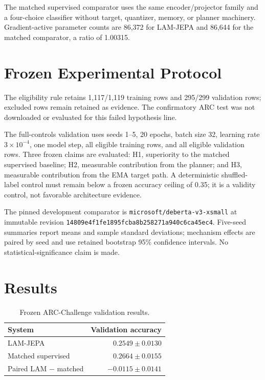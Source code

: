 \documentclass[conference]{IEEEtran}
\begin{document}
The matched supervised comparator uses the same encoder/projector family and a four-choice classifier without target, quantizer, memory, or planner machinery. Gradient-active parameter counts are 86,372 for LAM-JEPA and 86,644 for the matched comparator, a ratio of 1.00315.

\section{Frozen Experimental Protocol}
The eligibility rule retains 1,117/1,119 training rows and 295/299 validation rows; excluded rows remain retained as evidence. The confirmatory ARC test was not downloaded or evaluated for this failed hypothesis line.

The full-controls validation uses seeds 1--5, 20 epochs, batch size 32, learning rate $3\times10^{-4}$, one model step, all eligible training rows, and all eligible validation rows. Three frozen claims are evaluated: H1, superiority to the matched supervised baseline; H2, measurable contribution from the planner; and H3, measurable contribution from the EMA target path. A deterministic shuffled-label control must remain below a frozen accuracy ceiling of 0.35; it is a validity control, not favorable architecture evidence.

The pinned development comparator is \texttt{microsoft/deberta-v3-xsmall} at immutable revision \texttt{14809e4f1fe1895fcba8b258271a940c6ca45ec4}. Five-seed summaries report means and sample standard deviations; mechanism effects are paired by seed and use retained bootstrap 95\% confidence intervals. No statistical-significance claim is made.

\section{Results}
\begin{table}[t]
\caption{Frozen ARC-Challenge validation results.}
\label{tab:main}
\centering
\small
\begin{tabular}{@{}lr@{}}
\toprule
System & Validation accuracy \\
\midrule
LAM-JEPA & $0.2549\pm0.0130$ \\
Matched supervised & $0.2664\pm0.0155$ \\
Paired LAM $-$ matched & $-0.0115\pm0.0141$ \\
\bottomrule
\end{tabular}
\end{table}
\end{document}
